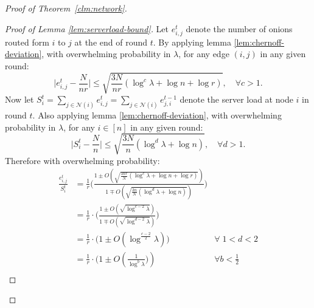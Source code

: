\begin{proof} [Proof of Theorem~\ref{clm:network}]
\begin{proof}[Proof of Lemma \ref{lem:serverload-bound}]
Let $e^t_{i,j}$ denote the number of onions routed form $i$ to $j$ at the end of round $t$. By applying lemma \ref{lem:chernoff-deviation}, with overwhelming probability in $\lambda$, for any edge $(i,j)$ in any given round:
$$
\Big|e^t_{i,j} - \frac{N}{nr}\Big| \leq \sqrt{\frac{3N}{nr}(\log^c \lambda + \log n + \log r)}, \quad \forall c > 1.
$$
Now let $S^t_i = \sum_{j \in \mathcal{N}(i)} e^t_{i,j} = \sum_{j \in \mathcal{N}(i)} e^{t - 1}_{j,i}$ denote the server load at node $i$ in round $t$. Also applying lemma \ref{lem:chernoff-deviation}, with overwhelming probability in $\lambda$, for any $i \in [n]$ in any given round:
$$
\Big|S^t_i - \frac{N}{n}\Big| \leq \sqrt{\frac{3N}{n}(\log^d \lambda + \log n)}, \quad \forall d > 1.
$$
Therefore with overwhelming probability:
\begin{align*}
\frac{e^t_{i,j}}{S^t_i} &= \frac{1}{r}\Big(\frac{1 \pm O(\sqrt{\frac{3nr}{N}(\log^c \lambda + \log n + \log r)})}{1 \mp O(\sqrt{\frac{3n}{N}(\log^d \lambda + \log n)})}\Big)\\
                        &= \frac{1}{r} \cdot \Big(\frac{1 \pm O(\sqrt{\log^{c - 2} \lambda})}{1 \mp O(\sqrt{\log^{d - 2} \lambda})}\Big)\\
                        &= \frac{1}{r} \cdot \Big(1 \pm O(\log^{\frac{c - 2}{2}} \lambda)\Big) &\forall \; 1 < d < 2\\
                        &= \frac{1}{r} \cdot \Big(1 \pm O(\frac{1}{\log^{b} \lambda}\Big)) &\forall b < \frac{1}{2}\\
\end{align*}


\end{proof}
\end{proof}
